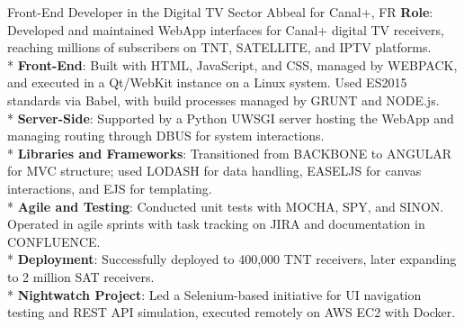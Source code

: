 \documentclass[
  a4paper,
   maincolor=cvblue,
   sectioncolor=cvblue,
]{fortysecondscv}
\begin{document}
\begin{cvtable}
    {Front-End Developer in the Digital TV Sector}
    {Abbeal for Canal+, FR}
    {
      \textbf{Role}: Developed and maintained WebApp interfaces for Canal+ digital TV receivers, reaching millions of subscribers on TNT, SATELLITE, and IPTV platforms.\\
      * \textbf{Front-End}: Built with HTML, JavaScript, and CSS, managed by WEBPACK, and executed in a Qt/WebKit instance on a Linux system. Used ES2015 standards via Babel, with build processes managed by GRUNT and NODE.js.\\
      * \textbf{Server-Side}: Supported by a Python UWSGI server hosting the WebApp and managing routing through DBUS for system interactions.\\
      * \textbf{Libraries and Frameworks}: Transitioned from BACKBONE to ANGULAR for MVC structure; used LODASH for data handling, EASELJS for canvas interactions, and EJS for templating.\\
      * \textbf{Agile and Testing}: Conducted unit tests with MOCHA, SPY, and SINON. Operated in agile sprints with task tracking on JIRA and documentation in CONFLUENCE.\\
      * \textbf{Deployment}: Successfully deployed to 400,000 TNT receivers, later expanding to 2 million SAT receivers.\\
      * \textbf{Nightwatch Project}: Led a Selenium-based initiative for UI navigation testing and REST API simulation, executed remotely on AWS EC2 with Docker.\\
    }
\end{cvtable}
\end{document}
